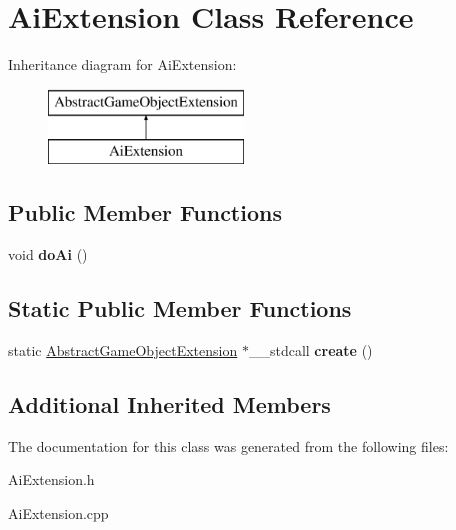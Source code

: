 \hypertarget{class_ai_extension}{}\section{Ai\+Extension Class Reference}
\label{class_ai_extension}
Inheritance diagram for Ai\+Extension\+:\begin{figure}[H]
\begin{center}
\leavevmode
\includegraphics[height=2.000000cm]{class_ai_extension}
\end{center}
\end{figure}
\subsection*{Public Member Functions}
\begin{DoxyCompactItemize}
\item 
\mbox{\label{class_ai_extension_ae409686820de2db2fc0125987500bc71}} 
void {\bfseries do\+Ai} ()
\end{DoxyCompactItemize}
\subsection*{Static Public Member Functions}
\begin{DoxyCompactItemize}
\item 
\mbox{\label{class_ai_extension_ac6134bbf56c9f7bfd1e5707ca05475bf}} 
static \mbox{\hyperlink{class_abstract_game_object_extension}{Abstract\+Game\+Object\+Extension}} $\ast$\+\_\+\+\_\+stdcall {\bfseries create} ()
\end{DoxyCompactItemize}
\subsection*{Additional Inherited Members}


The documentation for this class was generated from the following files\+:\begin{DoxyCompactItemize}
\item 
Ai\+Extension.\+h\item 
Ai\+Extension.\+cpp\end{DoxyCompactItemize}
